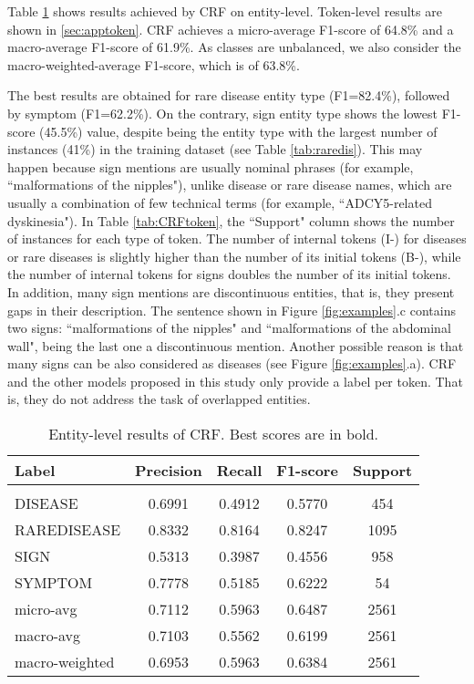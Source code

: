 \documentclass[preprint,12pt]{elsarticle}
\begin{document}
Table \ref{tab:CRFentity} shows results achieved by CRF on entity-level. Token-level results are shown in \ref{sec:apptoken}. CRF achieves a micro-average F1-score of 64.8\% and a macro-average F1-score of 61.9\%. As classes are unbalanced, we also consider the macro-weighted-average F1-score, which is of 63.8\%.

The best results are obtained for rare disease entity type (F1=82.4\%), followed by symptom  (F1=62.2\%). 
On the contrary, sign entity type shows the lowest F1-score (45.5\%) value, despite being the entity type with the largest number of instances (41\%) in the training dataset (see Table \ref{tab:raredis}). 
This may happen because sign mentions are usually nominal phrases (for example, ``malformations of the nipples"), unlike disease or rare disease names, which are usually a combination of few technical terms (for example,  ``ADCY5-related dyskinesia"). In Table \ref{tab:CRFtoken}, the ``Support" column shows the number of instances for each type of token. The number of internal tokens (I-) for diseases or rare diseases is slightly higher than the number of its initial tokens (B-), while the number of internal tokens for signs doubles the number of its initial tokens. In addition, many sign mentions are discontinuous entities, that is, they present gaps in their description. The sentence shown in Figure \ref{fig:examples}.c contains two signs: ``malformations of the nipples" and ``malformations of the abdominal wall", being the last one a discontinuous mention.
Another possible reason is that many signs can be also considered as diseases (see Figure \ref{fig:examples}.a). CRF and the other models proposed in this study only provide a label per token. That is, they do not address the task of overlapped entities.  

\begin{table}[!htbp]
\centering
\small
\caption{\label{tab:CRFentity}Entity-level results of CRF. Best scores are in bold.}
\begin{tabular}{lcccc}
\\
{\bf Label} & {\bf Precision} &
{\bf Recall} &
{\bf F1-score} & {\bf Support} \\
\hline\\[-8pt]

DISEASE	&	0.6991	&	0.4912	&	0.5770	&	454\\
RAREDISEASE	&	0.8332	&	0.8164	&	0.8247	&	1095\\
SIGN	&	0.5313	&	0.3987	&	0.4556	&	958\\
SYMPTOM	&	0.7778	&	0.5185	&	0.6222	&	54\\
micro-avg	&	0.7112	&	0.5963	&	0.6487	&	2561\\
macro-avg	&	0.7103	&	0.5562	&	0.6199	&	2561\\
macro-weighted	&	0.6953	&	0.5963	&	0.6384	&	2561\\
\hline
\end{tabular}
\end{table}
\end{document}
